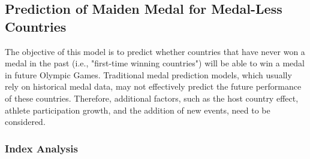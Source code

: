 \documentclass{mcmthesis}
\begin{document}
%



\subsection{ Prediction of Maiden Medal for Medal-Less Countries}
The objective of this model is to predict whether countries that have never won a medal in the past (i.e., "first-time winning countries") will be able to win a medal in future Olympic Games. Traditional medal prediction models, which usually rely on historical medal data, may not effectively predict the future performance of these countries. Therefore, additional factors, such as the host country effect, athlete participation growth, and the addition of new events, need to be considered.

\subsubsection{Index Analysis}
\end{document}
